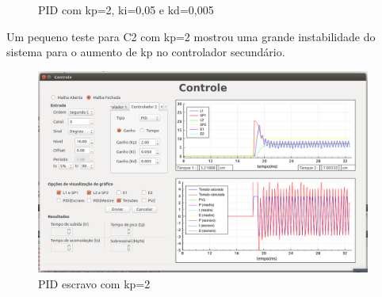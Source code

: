 \documentclass[a4paper,12pt]{article}
\begin{document}
\begin{figure}[H]
\hspace{1cm}
\hspace{1cm}
\hspace{1cm}
     \caption{PID com kp=2,  ki=0,05 e kd=0,005}
     \label{fig:ControlePID2}
\end{figure}

\newpage
Um pequeno teste para C2 com kp=2 mostrou uma grande instabilidade do sistema para o aumento de kp no controlador secundário.
\hspace{1cm}

\begin{figure}[!h]
\centering
\includegraphics[width=11cm]{ImagensLab4/testes/4-2.png}
\caption{PID escravo com kp=2}
\label{img4-4}
\end{figure}
\end{document}
